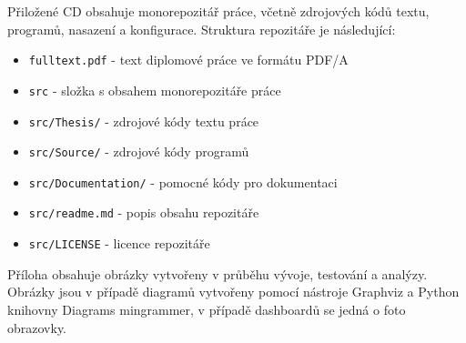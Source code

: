 
\listofappendices


Přiložené CD obsahuje monorepozitář práce, včetně zdrojových kódů textu, programů, nasazení a konfigurace. Struktura repozitáře je následující:

\begin{itemize}
    \item \texttt{fulltext.pdf} - text diplomové práce ve formátu PDF/A
    \item \texttt{src} - složka s obsahem monorepozitáře práce
    \item \texttt{src/Thesis/} - zdrojové kódy textu práce
    \item \texttt{src/Source/} - zdrojové kódy programů
    \item \texttt{src/Documentation/} - pomocné kódy pro dokumentaci
    \item \texttt{src/readme.md} - popis obsahu repozitáře
    \item \texttt{src/LICENSE} - licence repozitáře
\end{itemize}


Příloha obsahuje obrázky vytvořeny v průběhu vývoje, testování a analýzy. Obrázky jsou v případě diagramů vytvořeny pomocí nástroje Graphviz a Python knihovny Diagrams mingrammer, v případě dashboardů se jedná o foto obrazovky. \\







